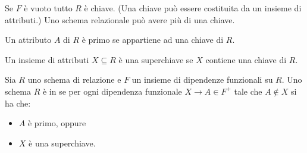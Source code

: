 Se $F$ \`e vuoto tutto $R$ \`e chiave. (Una chiave pu\`o essere costituita da un insieme di attributi.) Uno schema relazionale pu\`o avere pi\`u di una chiave.

\begin{defn}
Un attributo $A$ di $R$ \`e primo se appartiene ad una chiave di $R$.
\end{defn}

\begin{defn}[Superchiave]
Un insieme di attributi $X \subseteq R$ \`e una superchiave se $X$ contiene una chiave di $R$.
\end{defn}




\begin{defn}
\label{3NF}
Sia $R$ uno schema di relazione e $F$ un insieme di dipendenze funzionali su $R$. Uno schema $R$ \`e in  se per ogni dipendenza funzionale $X \to A \in F^{+}$ tale che $A \notin X$ si ha che:
\begin{itemize}
    \item $A$ \`e primo, oppure
    \item $X$ \`e una superchiave.
\end{itemize}
\end{defn}


